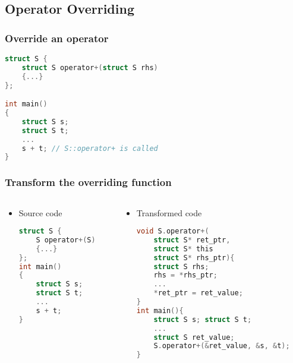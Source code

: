 \documentclass{beamer}
\begin{document}
\subsection{Operator Overriding}

\begin{frame}[fragile]
    \frametitle{Override an operator}

    \begin{lstlisting}[language=C]
struct S {
    struct S operator+(struct S rhs)
    {...}
};

int main()
{
    struct S s;
    struct S t;
    ...
    s + t; // S::operator+ is called
}
    \end{lstlisting}
\end{frame}

\begin{frame}[fragile]
    \frametitle{Transform the overriding function}
    \begin{columns}
        \begin{column}[]{0.4\textwidth}
            \begin{itemize}
                \item Source code
                      \small
                      \begin{lstlisting}[language=C]
struct S {
    S operator+(S)
    {...}
};
int main()
{
    struct S s;
    struct S t;
    ...
    s + t;
}
                    \end{lstlisting}
            \end{itemize}

        \end{column}

        \begin{column}[]{0.8\textwidth}
            \begin{itemize}
                \item Transformed code
                      \small
                      \begin{lstlisting}[language=C]
void S.operator+(
    struct S* ret_ptr, 
    struct S* this
    struct S* rhs_ptr){
    struct S rhs;
    rhs = *rhs_ptr;
    ...
    *ret_ptr = ret_value;
}
int main(){
    struct S s; struct S t;
    ...
    struct S ret_value;
    S.operator+(&ret_value, &s, &t);
}
                \end{lstlisting}
            \end{itemize}
        \end{column}
    \end{columns}
\end{frame}
\end{document}
